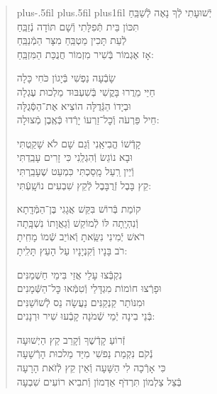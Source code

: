 \documentclass[twoside, openany, parskip=half, 11pt]{book}
\begin{document}
\begin{quote}
\leftskip=0pt plus-.5fil
\rightskip=0pt plus.5fil
\parfillskip=0pt plus1fil
יְֿשׁוּעָתִי \hfill לְֿךָ נָאֶה לְֿשַׁבֵּֽחַ \\ תִּכּוֹן בֵּית תְּֿפִלָּתִי \hfill וְֿשָׁם תּוֹדָה נְֿזַבֵּֽחַ \\
לְֿעֵת תָּכִין מַטְבֵּֽחַ \hfill מִצָּר הַמְֿנַבֵּֽחַ \\ אָז אֶגְמוֹר בְּֿשִׁיר מִזְמוֹר \hfill חֲנֻכַּת הַמִּזְבֵּֽחַ:

שָׂבְֿעָה נַפְשִׁי \hfill בְּֿיָגוֹן כֹּחִי כָּלָה \\ חַיַּי מֵרֲרוּ בָּקֳשִׁי \hfill בְּֿשִׁעְבּוּד מַלְכוּת עֶגְלָה \\
וּבְיָדוֹ הַגְּֿדֻלָּה \hfill הוֹצִיא אֶת־הַסְּֿגֻלָּה \\ חֵיל פַּרְעֹה וְֿכׇל־זַרְעוֹ \hfill יָרְֿדוּ כְּֿאֶֽבֶן מְֿצוּלָה:

קָדְֿשׁוֹ הֱבִיאַֽנִי \hfill וְֿגַם שָׁם לֹא שָׁקַֽטְתִּי \\ וּבָא נוֹגֵשׂ וְֿהִגְלַֽנִי \hfill כִּי זָרִים עָבַֽדְתִּי \\
וְֿיֵין רַֽעַל מָֽסַכְתִּי \hfill כִּמְעַט שֶׁעָבַֽרְתִּי \\ קֵץ בָּבֶל זְֿרֻבָּבֶל \hfill לְֿקֵץ שִׁבְעִים נוֹשָֽׁעְֿתִּי:

קוֹמַת בְּֿרוֹשׁ בִּקֵּשׁ \hfill אֲגָגִי בֶּן־הַמְּֿדָֽתָא \\ וְֿנִהְיָֽתָה לּוֹ לְֿמוֹקֵשׁ \hfill וְֿגַאֲוָתוֹ נִשְׁבָּֽתָה \\
רֹאשׁ יְֿמִינִי נִשֵּֽׂאתָ \hfill וְֿאוֹיֵב שְֿׁמוֹ מָחִֽיתָ \\ רֹב בָּנָיו וְֿקִנְיָנָיו \hfill עַל הָעֵץ תָּלִֽיתָ:

נִקְבְּֿצוּ עָלַי \hfill אֲזַי בִּימֵי חַשְׁמַנִּים \\ וּפָרְֿצוּ חוֹמוֹת מִגְדָּלַי \hfill וְֿטִמְּֿאוּ כׇּל־הַשְּֿׁמָנִים \\
וּמִנּוֹתַר קַנְקַנִּים \hfill נַעֲשָׂה נֵס לְֿשׁוֹשַׁנִּים \\ בְּֿנֵי בִינָה יְֿמֵי שְֿׁמֹנָה \hfill קָבְֿעוּ שִׁיר וּרְנָנִים:


זְֿרוֹעַ קָדְֿשֶׁךָ \hfill וְֿקָרֵב קֵץ הַיְשׁוּעָה\\
נְֿקֹם נִקְמַת נַפשִׁי \hfill מִיַּד מַלכוּת הָרְֿשָׁעָה\\
כִּי אָרְֿכָה לִי הַשָּׁעָה \hfill וְֿאֵין קֵץ לְֿזׂאת הָרָעָה\\
בְּֿצֵל צַלְמוֹן תִּרְדּׂף אַדְמוֹן \hfill וְֿתבִיא רוֹעִים שִׁבְעָה

\end{quote}
\end{document}
